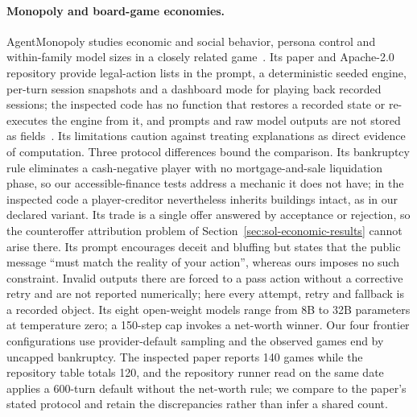 \paragraph{Monopoly and board-game economies.}
AgentMonopoly studies economic and social behavior, persona control and within-family model sizes in a closely related game~\cite{wu2026agentmonopoly}. Its paper and Apache-2.0 repository provide legal-action lists in the prompt, a deterministic seeded engine, per-turn session snapshots and a dashboard mode for playing back recorded sessions; the inspected code has no function that restores a recorded state or re-executes the engine from it, and prompts and raw model outputs are not stored as fields~\cite{agentmonopoly2026repo}. Its limitations caution against treating explanations as direct evidence of computation. Three protocol differences bound the comparison. Its bankruptcy rule eliminates a cash-negative player with no mortgage-and-sale liquidation phase, so our accessible-finance tests address a mechanic it does not have; in the inspected code a player-creditor nevertheless inherits buildings intact, as in our declared variant. Its trade is a single offer answered by acceptance or rejection, so the counteroffer attribution problem of Section~\ref{sec:sol-economic-results} cannot arise there. Its prompt encourages deceit and bluffing but states that the public message ``must match the reality of your action'', whereas ours imposes no such constraint. Invalid outputs there are forced to a pass action without a corrective retry and are not reported numerically; here every attempt, retry and fallback is a recorded object. Its eight open-weight models range from 8B to 32B parameters at temperature zero; a 150-step cap invokes a net-worth winner. Our four frontier configurations use provider-default sampling and the observed games end by uncapped bankruptcy. The inspected paper reports 140 games while the repository table totals 120, and the repository runner read on the same date applies a 600-turn default without the net-worth rule; we compare to the paper's stated protocol and retain the discrepancies rather than infer a shared count.


